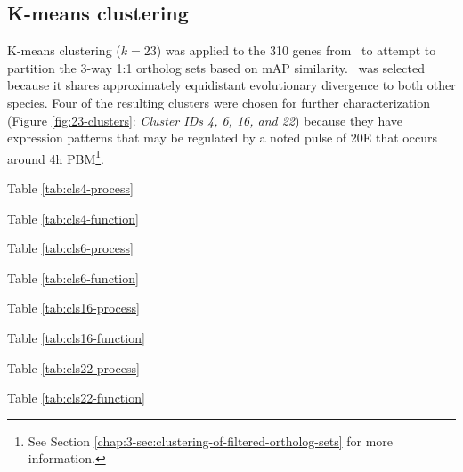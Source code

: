 \subsection{K-means clustering}

K-means clustering ($k=23$) was applied to the 310 genes from \Ag\ to attempt to partition the 3-way 1:1 ortholog sets based on \gls{mAP} similarity.
%
\Ag\ was selected because it shares approximately equidistant evolutionary divergence to both other species.
%
Four of the resulting clusters were chosen for further characterization (Figure \ref{fig:23-clusters}: \textit{Cluster IDs 4, 6, 16, and 22}) because they have expression patterns that may be regulated by a noted pulse of \gls{20E} that occurs around 4h \gls{PBM}\footnote{See Section \ref{chap:3-sec:clustering-of-filtered-ortholog-sets} for more information.}.
%





Table \ref{tab:cls4-process}

Table \ref{tab:cls4-function}
% 


Table \ref{tab:cls6-process}

Table \ref{tab:cls6-function}
% 


Table \ref{tab:cls16-process}

Table \ref{tab:cls16-function}
% 


Table \ref{tab:cls22-process}

Table \ref{tab:cls22-function}
% 

% 
% 
% 
% 




